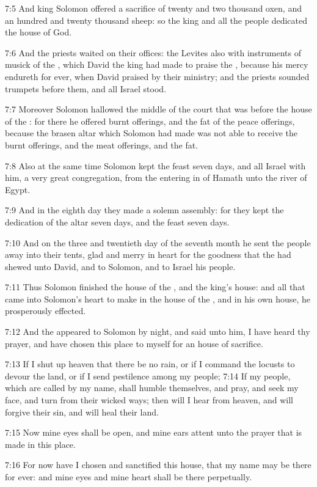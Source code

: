 7:5 And king Solomon offered a sacrifice of twenty and two thousand
oxen, and an hundred and twenty thousand sheep: so the king and all
the people dedicated the house of God.

7:6 And the priests waited on their offices: the Levites also with
instruments of musick of the \LORD, which David the king had made to
praise the \LORD, because his mercy endureth for ever, when David
praised by their ministry; and the priests sounded trumpets before
them, and all Israel stood.

7:7 Moreover Solomon hallowed the middle of the court that was before
the house of the \LORD: for there he offered burnt offerings, and the
fat of the peace offerings, because the brasen altar which Solomon had
made was not able to receive the burnt offerings, and the meat
offerings, and the fat.

7:8 Also at the same time Solomon kept the feast seven days, and all
Israel with him, a very great congregation, from the entering in of
Hamath unto the river of Egypt.

7:9 And in the eighth day they made a solemn assembly: for they kept
the dedication of the altar seven days, and the feast seven days.

7:10 And on the three and twentieth day of the seventh month he sent
the people away into their tents, glad and merry in heart for the
goodness that the \LORD had shewed unto David, and to Solomon, and to
Israel his people.

7:11 Thus Solomon finished the house of the \LORD, and the king's
house: and all that came into Solomon's heart to make in the house of
the \LORD, and in his own house, he prosperously effected.

7:12 And the \LORD appeared to Solomon by night, and said unto him, I
have heard thy prayer, and have chosen this place to myself for an
house of sacrifice.

7:13 If I shut up heaven that there be no rain, or if I command the
locusts to devour the land, or if I send pestilence among my people;
7:14 If my people, which are called by my name, shall humble
themselves, and pray, and seek my face, and turn from their wicked
ways; then will I hear from heaven, and will forgive their sin, and
will heal their land.

7:15 Now mine eyes shall be open, and mine ears attent unto the prayer
that is made in this place.

7:16 For now have I chosen and sanctified this house, that my name may
be there for ever: and mine eyes and mine heart shall be there
perpetually.

